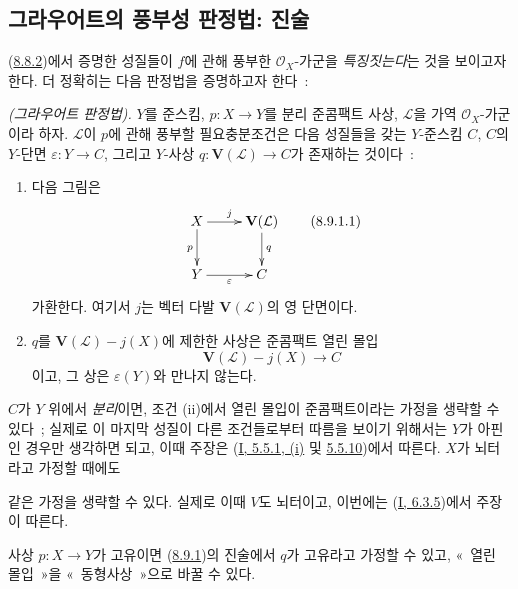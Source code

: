 \subsection{그라우어트의 풍부성 판정법: 진술}
\label{subsection:II.8.9-ko}

(\hyperref[II.8.8.2-ko]{8.8.2})에서 증명한 성질들이 $f$에 관해 풍부한
$\mathcal{O}_X$-가군을 \emph{특징짓는다}는 것을 보이고자 한다. 더 정확히는
다음 판정법을 증명하고자 한다~:

\begin{theorem}[8.9.1]
\label{II.8.9.1-ko}
\emph{(그라우어트 판정법).} $Y$를 준스킴,
$p:X\to Y$를 분리 준콤팩트 사상, $\mathcal{L}$을 가역
$\mathcal{O}_X$-가군이라 하자. $\mathcal{L}$이 $p$에 관해 풍부할
필요충분조건은 다음 성질들을 갖는 $Y$-준스킴 $C$, $C$의 $Y$-단면
$\varepsilon:Y\to C$, 그리고 $Y$-사상
$q:\mathbf{V}(\mathcal{L})\to C$가 존재하는 것이다~:
\begin{enumerate}
  \item[\rm{(i)}] 다음 그림은
  \begin{equation}
  \label{II.8.9.1.1-ko}
    \xymatrix{
      X\ar[r]^{j}\ar[d]_{p} & \mathbf{V}(\mathcal{L})\ar[d]^{q}\\
      Y\ar[r]_{\varepsilon} & C
    }
  \tag{8.9.1.1}
  \end{equation}
  가환한다. 여기서 $j$는 벡터 다발 $\mathbf{V}(\mathcal{L})$의 영
  단면이다.
  \item[\rm{(ii)}] $q$를 $\mathbf{V}(\mathcal{L})-j(X)$에 제한한
  사상은 준콤팩트 열린 몰입
  \[
    \mathbf{V}(\mathcal{L})-j(X)\longrightarrow C
  \]
  이고, 그 상은 $\varepsilon(Y)$와 만나지 않는다.
\end{enumerate}
\end{theorem}

$C$가 $Y$ 위에서 \emph{분리}이면, 조건 (ii)에서 열린 몰입이
준콤팩트이라는 가정을 생략할 수 있다~; 실제로 이 마지막 성질이 다른
조건들로부터 따름을 보이기 위해서는 $Y$가 아핀인 경우만 생각하면
되고, 이때 주장은 (\hyperref[I.5.5.1-ko]{I, 5.5.1, (i)} 및
\hyperref[I.5.5.10-ko]{5.5.10})에서 따른다. $X$가 뇌터라고 가정할
때에도

같은 가정을 생략할 수 있다. 실제로 이때 $V$도 뇌터이고, 이번에는
(\hyperref[I.6.3.5-ko]{I, 6.3.5})에서 주장이 따른다.

\begin{corollary}[8.9.2]
\label{II.8.9.2-ko}
사상 $p:X\to Y$가 고유이면 (\hyperref[II.8.9.1-ko]{8.9.1})의 진술에서
$q$가 고유라고 가정할 수 있고, «~열린 몰입~»을 «~동형사상~»으로
바꿀 수 있다.
\end{corollary}

